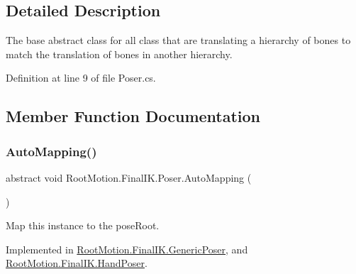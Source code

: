 \subsection{Detailed Description}
The base abstract class for all class that are translating a hierarchy of bones to match the translation of bones in another hierarchy. 



Definition at line 9 of file Poser.\+cs.



\subsection{Member Function Documentation}
\mbox{\label{class_root_motion_1_1_final_i_k_1_1_poser_af8bf01f5bada3be99c43121b61022238}} 
\subsubsection{\texorpdfstring{Auto\+Mapping()}{AutoMapping()}}
{\footnotesize\ttfamily abstract void Root\+Motion.\+Final\+I\+K.\+Poser.\+Auto\+Mapping (\begin{DoxyParamCaption}{ }\end{DoxyParamCaption})\hspace{0.3cm}{\ttfamily [pure virtual]}}



Map this instance to the pose\+Root. 



Implemented in \mbox{\hyperlink{class_root_motion_1_1_final_i_k_1_1_generic_poser_a38993eecf09618c2ade7f3afe8a36ad7}{Root\+Motion.\+Final\+I\+K.\+Generic\+Poser}}, and \mbox{\hyperlink{class_root_motion_1_1_final_i_k_1_1_hand_poser_a9e414a816ca5c67281de9160f250e408}{Root\+Motion.\+Final\+I\+K.\+Hand\+Poser}}.

\mbox{\label{class_root_motion_1_1_final_i_k_1_1_poser_ad80c2188b9a1855ff78f3dadba42362d}} 
